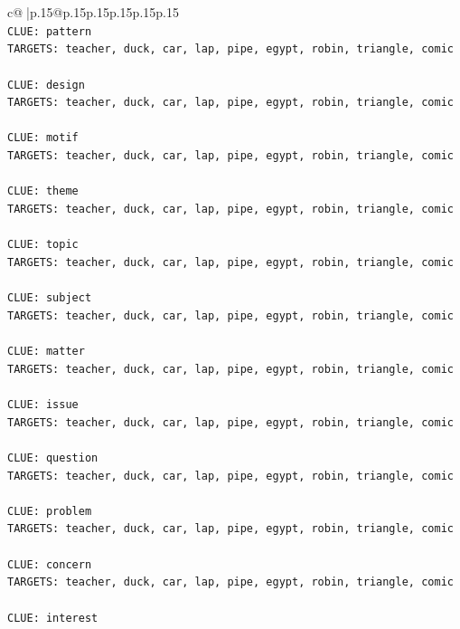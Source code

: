 \documentclass{article}
\begin{document}
{\begin{supertabular}{c@{$\;$}|p{.15\linewidth}@{}p{.15\linewidth}p{.15\linewidth}p{.15\linewidth}p{.15\linewidth}p{.15\linewidth}}
{{{\\ 
\texttt{CLUE: pattern} \\
\texttt{TARGETS: teacher, duck, car, lap, pipe, egypt, robin, triangle, comic} \\
\\ 
\texttt{CLUE: design} \\
\texttt{TARGETS: teacher, duck, car, lap, pipe, egypt, robin, triangle, comic} \\
\\ 
\texttt{CLUE: motif} \\
\texttt{TARGETS: teacher, duck, car, lap, pipe, egypt, robin, triangle, comic} \\
\\ 
\texttt{CLUE: theme} \\
\texttt{TARGETS: teacher, duck, car, lap, pipe, egypt, robin, triangle, comic} \\
\\ 
\texttt{CLUE: topic} \\
\texttt{TARGETS: teacher, duck, car, lap, pipe, egypt, robin, triangle, comic} \\
\\ 
\texttt{CLUE: subject} \\
\texttt{TARGETS: teacher, duck, car, lap, pipe, egypt, robin, triangle, comic} \\
\\ 
\texttt{CLUE: matter} \\
\texttt{TARGETS: teacher, duck, car, lap, pipe, egypt, robin, triangle, comic} \\
\\ 
\texttt{CLUE: issue} \\
\texttt{TARGETS: teacher, duck, car, lap, pipe, egypt, robin, triangle, comic} \\
\\ 
\texttt{CLUE: question} \\
\texttt{TARGETS: teacher, duck, car, lap, pipe, egypt, robin, triangle, comic} \\
\\ 
\texttt{CLUE: problem} \\
\texttt{TARGETS: teacher, duck, car, lap, pipe, egypt, robin, triangle, comic} \\
\\ 
\texttt{CLUE: concern} \\
\texttt{TARGETS: teacher, duck, car, lap, pipe, egypt, robin, triangle, comic} \\
\\ 
\texttt{CLUE: interest} \\
}}}
\end{supertabular}}
\end{document}
